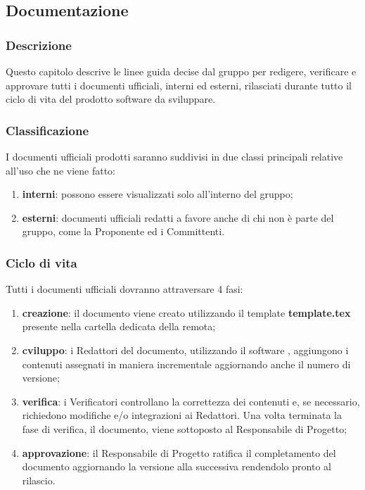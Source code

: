 \subsection{Documentazione}

	\subsubsection{Descrizione}
	Questo capitolo descrive le linee guida decise dal gruppo per redigere, verificare e approvare tutti i documenti ufficiali, interni ed esterni, rilasciati durante tutto il ciclo di vita del prodotto software da sviluppare.

	\subsubsection{Classificazione}
	I documenti ufficiali prodotti saranno suddivisi in due classi principali relative all'uso che ne viene fatto:
	\begin{enumerate}
		\item \textbf{interni}: possono essere visualizzati solo all'interno del gruppo;
		\item \textbf{esterni}: documenti ufficiali redatti a favore anche di chi non è parte del gruppo, come la Proponente ed i Committenti.
	\end{enumerate}

	\subsubsection{Ciclo di vita}
	Tutti i documenti ufficiali dovranno attraversare 4 fasi:
	\begin{enumerate}
		\item \textbf{creazione}: il documento viene creato utilizzando il template \textbf{template.tex} presente nella cartella dedicata della  remota;
		\item \textbf{cviluppo}: i Redattori del documento, utilizzando il software , aggiungono i contenuti assegnati in maniera incrementale aggiornando anche il numero di versione;
		\item \textbf{verifica}: i Verificatori controllano la correttezza dei contenuti e, se necessario, richiedono modifiche e/o integrazioni ai Redattori. Una volta terminata la fase di verifica, il documento, viene sottoposto al Responsabile di Progetto;
		\item \textbf{approvazione}: il Responsabile di Progetto ratifica il completamento del documento aggiornando la versione alla  successiva rendendolo pronto al rilascio.
	\end{enumerate}

